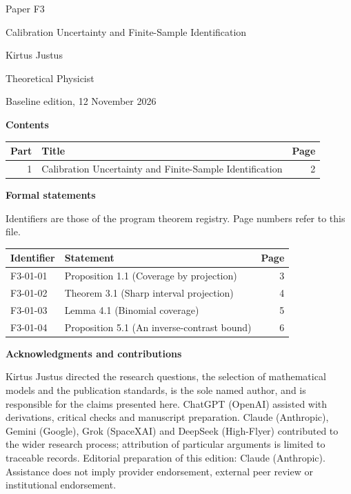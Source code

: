 \documentclass[11pt,a4paper]{article}
\begin{document}
\thispagestyle{empty}\pagestyle{empty}
{\small\sffamily \ProgramTitle\hfill Paper F3\par}
\vspace*{12mm}
{\LARGE\bfseries\raggedright{} Calibration Uncertainty and Finite-Sample Identification\par}
\vspace{9mm}
{\large Kirtus Justus\par}\vspace{1mm}Theoretical Physicist\par\AuthorLocation\par\vspace{2mm}Baseline edition, 12 November 2026\par\vspace{8mm}
\textbf{Contents}\par\vspace{1mm}
{\small\begin{longtable}{@{}r>{\raggedright\arraybackslash}p{}r@{}}
\toprule Part & Title & Page\\\midrule\endhead
1 & Calibration Uncertainty and Finite-Sample Identification & 2\\
\bottomrule\end{longtable}}
\vspace{2mm}\textbf{Formal statements}\par\vspace{1mm}
{\footnotesize Identifiers are those of the program theorem registry. Page numbers refer to this file.\par}
{\footnotesize\begin{longtable}{@{}l>{\raggedright\arraybackslash}p{}r@{}}
\toprule Identifier & Statement & Page\\\midrule\endhead
F3-01-01 & Proposition 1.1 (Coverage by projection) & 3\\
F3-01-02 & Theorem 3.1 (Sharp interval projection) & 4\\
F3-01-03 & Lemma 4.1 (Binomial coverage) & 5\\
F3-01-04 & Proposition 5.1 (An inverse-contrast bound) & 6\\
\bottomrule\end{longtable}}
\vspace{3mm}\textbf{Acknowledgments and contributions}\par
{\small Kirtus Justus directed the research questions, the selection of mathematical models and the publication standards, is the sole named author, and is responsible for the claims presented here. ChatGPT (OpenAI) assisted with derivations, critical checks and manuscript preparation. Claude (Anthropic), Gemini (Google), Grok (SpaceXAI) and DeepSeek (High-Flyer) contributed to the wider research process; attribution of particular arguments is limited to traceable records. Editorial preparation of this edition: Claude (Anthropic). Assistance does not imply provider endorsement, external peer review or institutional endorsement.\par}
\end{document}
